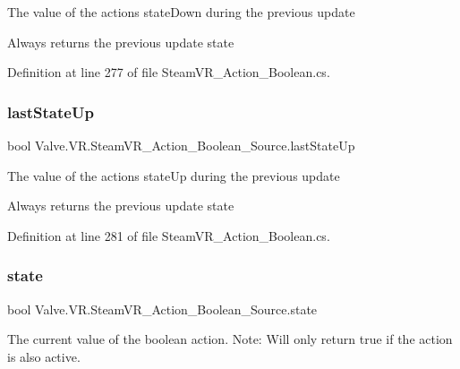 The value of the action\textquotesingle{}s \textquotesingle{}state\+Down\textquotesingle{} during the previous update 

Always returns the previous update state

Definition at line 277 of file Steam\+V\+R\+\_\+\+Action\+\_\+\+Boolean.\+cs.

\mbox{\label{class_valve_1_1_v_r_1_1_steam_v_r___action___boolean___source_aabdbb44ebb825ceb88524a655f4bbdd9}} 
\subsubsection{\texorpdfstring{lastStateUp}{lastStateUp}}
{\footnotesize\ttfamily bool Valve.\+V\+R.\+Steam\+V\+R\+\_\+\+Action\+\_\+\+Boolean\+\_\+\+Source.\+last\+State\+Up\hspace{0.3cm}{\ttfamily [get]}}



The value of the action\textquotesingle{}s \textquotesingle{}state\+Up\textquotesingle{} during the previous update 

Always returns the previous update state

Definition at line 281 of file Steam\+V\+R\+\_\+\+Action\+\_\+\+Boolean.\+cs.

\mbox{\label{class_valve_1_1_v_r_1_1_steam_v_r___action___boolean___source_a63563619aa24bc698e0291a332ee68ae}} 
\subsubsection{\texorpdfstring{state}{state}}
{\footnotesize\ttfamily bool Valve.\+V\+R.\+Steam\+V\+R\+\_\+\+Action\+\_\+\+Boolean\+\_\+\+Source.\+state\hspace{0.3cm}{\ttfamily [get]}}



The current value of the boolean action. Note\+: Will only return true if the action is also active. 



